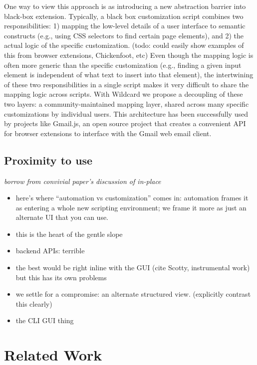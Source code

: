 \documentclass[sigplan,10pt,anonymous,review]{acmart}
\providecommand{\tightlist}{%
  \setlength{\itemsep}{0pt}\setlength{\parskip}{0pt}}
\begin{document}
One way to view this approach is as introducing a new abstraction
barrier into black-box extension. Typically, a black box customization
script combines two responsibilities: 1) mapping the low-level details
of a user interface to semantic constructs (e.g., using CSS selectors to
find certain page elements), and 2) the actual logic of the specific
customization. (todo: could easily show examples of this from browser
extensions, Chickenfoot, etc) Even though the mapping logic is often
more generic than the specific customization (e.g., finding a given
input element is independent of what text to insert into that element),
the intertwining of these two responsibilities in a single script makes
it very difficult to share the mapping logic across scripts. With
Wildcard we propose a decoupling of these two layers: a
community-maintained mapping layer, shared across many specific
customizations by individual users. This architecture has been
successfully used by projects like Gmail.js, an open source project that
creates a convenient API for browser extensions to interface with the
Gmail web email client.

\hypertarget{proximity-to-use}{%
\subsection{Proximity to use}\label{proximity-to-use}}

\emph{borrow from convivial paper's discussion of in-place}

\begin{itemize}
\tightlist
\item
  here's where ``automation vs customization'' comes in: automation
  frames it as entering a whole new scripting environment; we frame it
  more as just an alternate UI that you can use.
\item
  this is the heart of the gentle slope
\item
  backend APIs: terrible
\item
  the best would be right inline with the GUI (cite Scotty, instrumental
  work) but this has its own problems
\item
  we settle for a compromise: an alternate structured view. (explicitly
  contrast this clearly)
\item
  the CLI GUI thing
\end{itemize}

\hypertarget{related-work}{%
\section{Related Work}\label{related-work}}
\end{document}
